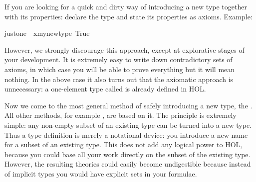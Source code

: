 \begin{isabellebody}
\begin{isamarkuptext}
If you are looking for a quick and dirty way of introducing a new type
together with its properties: declare the type and state its properties as
axioms. Example:%
\end{isamarkuptext}%
\isanewline
just{\isacharunderscore}one{\isacharcolon}\ {\isachardoublequote}{\isasymexists}{\isacharbang}\ x{\isacharcolon}{\isacharcolon}my{\isacharunderscore}new{\isacharunderscore}type{\isachardot}\ True{\isachardoublequote}%
\begin{isamarkuptext}%
\noindent
However, we strongly discourage this approach, except at explorative stages
of your development. It is extremely easy to write down contradictory sets of
axioms, in which case you will be able to prove everything but it will mean
nothing.  In the above case it also turns out that the axiomatic approach is
unnecessary: a one-element type called  is already defined in HOL.%
\end{isamarkuptext}%
%
%
\begin{isamarkuptext}%
\label{sec:typedef}
Now we come to the most general method of safely introducing a new type, the
. All other methods, for example
, are based on it. The principle is extremely simple:
any non-empty subset of an existing type can be turned into a new type.  Thus
a type definition is merely a notational device: you introduce a new name for
a subset of an existing type. This does not add any logical power to HOL,
because you could base all your work directly on the subset of the existing
type. However, the resulting theories could easily become undigestible
because instead of implicit types you would have explicit sets in your
formulae.


\end{isamarkuptext}
\end{isabellebody}
